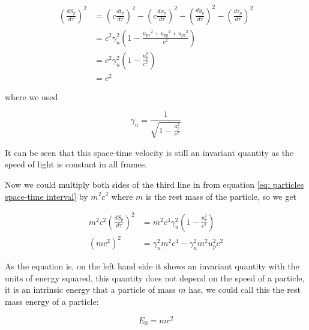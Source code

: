 \begin{equation}
	\label{eq: particles space-time interval}
	\begin{aligned}
		\left(\frac{dS_p}{d\tau}\right)^2 & = \left(c\frac{{{dt}_{p}}}{d\tau}\right)^2-\left(c\frac{dx_p}{d\tau}\right)^2-\left(\frac{dy_p}{d\tau}\right)^2-\left(\frac{dz_p}{d\tau}\right)^2 \\
		                                  & = {c}^2\gamma_{u}^2 \left( 1-\frac{{{u}_{px}}^2 + {{u}_{py}}^2 + {{u}_{pz}}^2}{{c}^2} \right)                                                         \\
		                                  & = {c}^2\gamma_{u}^2 \left( 1-\frac{u_p^2}{{c}^2} \right)                                                                                              \\
		                                  & = {c}^2
	\end{aligned}
\end{equation}

where we used

\begin{equation}
	\gamma_{u} = \frac{1}{\sqrt{1-\frac{u_p^2}{{c}^2}}}
\end{equation}

It can be seen that this space-time velocity is still an invariant quantity as the speed of light is constant in all frames.

Now we could multiply both sides of the third line in from equation \eqref{eq: particles space-time interval} by ${m}^2{c}^2$ where $m$ is the rest mass of the particle, so we get

\begin{equation}
	\label{eq: energy-momentum derivation}
	\begin{aligned}
		m^2 {c}^2 \left(\frac{dS_p}{d\tau}\right)^2 & = m^2{c}^4\gamma_{u}^2 \left( 1-\frac{u_p^2}{{c}^2} \right) \\
		({m}{c}^2)^2                                & = \gamma_{u}^2 m^2 c^4-\gamma_{u}^2 m^2 u_p^2 {c}^2
	\end{aligned}
\end{equation}

As the equation is, on the left hand side it shows an invariant quantity with the units of energy squared, this quantity does not depend on the speed of a particle, it is an intrinsic energy that a particle of mass $m$ has, we could call this the rest mass energy of a particle:

\begin{equation}
	E_0=mc^2
\end{equation}

